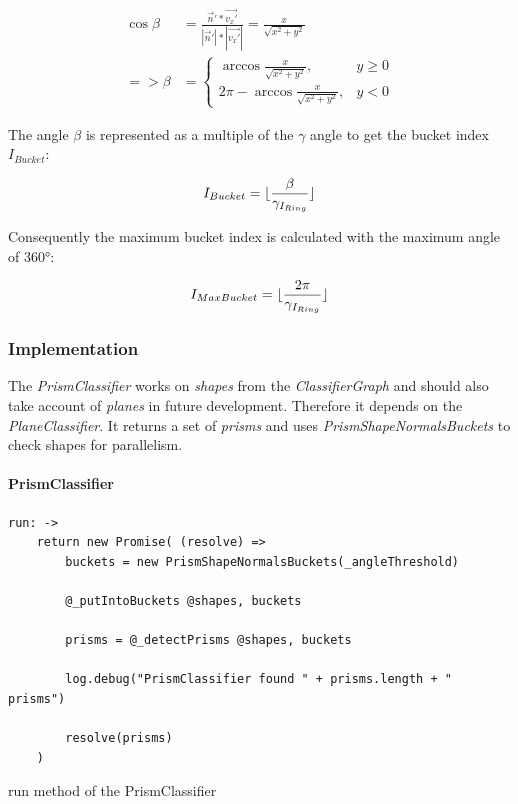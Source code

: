 \documentclass[../ClassicThesis.tex]{subfiles}
\begin{document}
\begin{equation}
\begin{split}
    \cos{\beta} & = \frac{\vec{n}' * \vec{v_{x}'}}{|\vec{n}'| * |\vec{v_{x}'}|} = \frac{x}{\sqrt{x^{2} + y^{2}}} \\
    => \beta & = \begin{cases}
        \arccos{ \frac{x}{\sqrt{x^{2} + y^{2}}} }, & y \geq 0 \\
        2 \pi - \arccos{ \frac{x}{\sqrt{x^{2} + y^{2}}} }, & y < 0
    \end{cases}
\end{split}
\end{equation}

The angle $ \beta $ is represented as a multiple of the $ \gamma $ angle to get the bucket index $ I_{Bucket} $:

\begin{equation}
    I_{Bucket} = \lfloor\frac{\beta}{ {\gamma}_{I_{Ring}} }\rfloor
\end{equation}

Consequently the maximum bucket index is calculated with the maximum angle of 360°:

\begin{equation}
    I_{MaxBucket} = \lfloor\frac{2 \pi}{ {\gamma}_{I_{Ring}} }\rfloor
\end{equation}



\subsubsection{Implementation}


The \emph{PrismClassifier} works on \emph{shapes} from the \emph{ClassifierGraph} and should also take account of \emph{planes} in future development. Therefore it depends on the \emph{PlaneClassifier}. It returns a set of \emph{prisms} and uses \emph{PrismShapeNormalsBuckets} to check shapes for parallelism.

\paragraph{PrismClassifier}

\begin{listing}[!h]
\centering
\begin{verbatim}
run: ->
    return new Promise( (resolve) =>
        buckets = new PrismShapeNormalsBuckets(_angleThreshold)

        @_putIntoBuckets @shapes, buckets
        
        prisms = @_detectPrisms @shapes, buckets
        
        log.debug("PrismClassifier found " + prisms.length + " prisms")
        
        resolve(prisms)
    )
\end{verbatim}
\caption{run method of the PrismClassifier}
\label{lst:PrismClassifierRun}
\end{listing}
\end{document}
